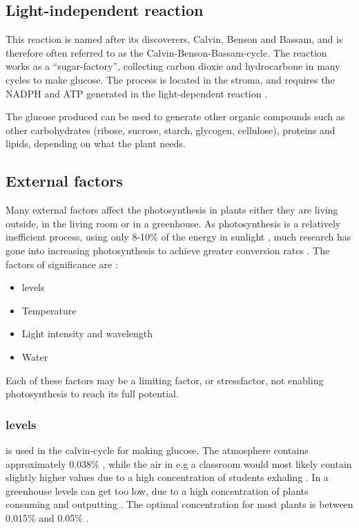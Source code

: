 \subsection{Light-independent reaction}
This reaction is named after its discoverers, Calvin, Benson and Bassam, and is therefore often referred to as the Calvin-Benson-Bassam-cycle. The reaction works as a “sugar-factory”, collecting carbon dioxie and hydrocarbone in many cycles to make glucose. The process is located in the stroma, and requires the NADPH and ATP generated in the light-dependent reaction \citep{bi2}. 

The glucose produced can be used to generate other organic compounds such as other carbohydrates (ribose, sucrose, starch, glycogen, cellulose), proteins and lipids, depending on what the plant needs.

\subsection{External factors}
Many external factors affect the photosynthesis in plants either they are living outside, in the living room or in a greenhouse. As photosynthesis is a relatively inefficient process, using only 8-10\% of the energy in sunlight \citetext{Long et. al, 2006; Zhu et. al, 2010, referenced in \citealp{kirschbaum2011does}}, much research has gone into increasing photosynthesis to achieve greater conversion rates \citetext{Reynolds et al., 2000; Sinclair et al., 2004; Long et al., 2006; Zhu et al., 2010, referenced in \citealp{kirschbaum2011does}}. The factors of significance are \citep{bios}:
\begin{itemize}
\item {} levels
\item Temperature
\item Light intensity and wavelength
\item Water
\end{itemize}
Each of these factors may be a limiting factor, or stressfactor, not enabling photosynthesis to reach its full potential. 

\subsubsection{ levels}
 is used in the calvin-cycle for making glucose. The atmosphere contains approximately 0.038\% , while the air in e.g a classroom would most likely contain slightly higher values due to a high concentration of students exhaling . In a greenhouse  levels can get too low, due to a high concentration of plants consuming  and outputting . The optimal concentration for most plants is between 0.015\% and 0.05\% \citep{bios}. 

